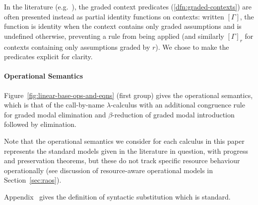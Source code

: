 \begin{remark}
In the literature (e.g.~\citet{brunel2014core,DBLP:conf/icfp/GaboardiKOBU16,DBLP:journals/pacmpl/OrchardLE19}),
the graded context predicates (\ref{dfn:graded-contexts}) are often presented instead as partial identity functions on contexts:
written $[ \Gamma ]$, the function is identity when the context contains only
graded assumptions and is undefined otherwise, preventing a rule from
being applied (and similarly $[ \Gamma ]_r$ for contexts
containing only assumptions graded by $r$).
We chose to make the predicates explicit for clarity.
\end{remark}

\paragraph{Operational Semantics}

Figure~\ref{fig:linear-base-ops-and-eqns} (first group) gives the
operational semantics, which is that of the call-by-name
$\lambda$-calculus with an additional congruence rule
for graded modal elimination and $\beta$-reduction of graded modal
introduction followed by elimination. %

Note that the operational semantics we consider for each calculus in this paper represents the standard
models given in the literature in question, with progress and
preservation theorems, but these do not track specific resource
behaviour operationally (see discussion of resource-aware operational
models in Section~\ref{sec:raos}).

Appendix~ gives the definition of syntactic
substitution which is standard.

